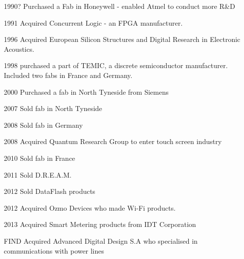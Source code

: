 \begin{enumerate}
\item[1990?] Purchased a Fab in Honeywell - enabled Atmel to conduct more R\&D
\item[1991] Acquired Concurrent Logic - an FPGA manufacturer. 
\item[1996] Acquired European Silicon Structures and Digital Research in Electronic Acoustics.
\item[1998] purchased a part of TEMIC, a discrete semiconductor manufacturer. Included two fabs in France and Germany.
\item[2000] Purchased a fab in North Tyneside from Siemens
\item[2007] Sold fab in North Tyneside
\item[2008] Sold fab in Germany
\item[2008] Acquired Quantum Research Group to enter touch screen industry
\item[2010] Sold fab in France
\item[2011] Sold D.R.E.A.M. 
\item[2012] Sold DataFlash products
\item[2012] Acquired Ozmo Devices who made Wi-Fi products.
\item[2013] Acquired Smart Metering products from IDT Corporation
\item[FIND] Acquired Advanced Digital Design S.A who specialised in communications with power lines
\end{enumerate}

